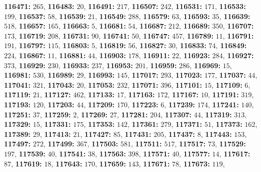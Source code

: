 \textsf{\bfseries 116471:} $265$, \textsf{\bfseries 116483:} $20$, \textsf{\bfseries 116491:} $217$, \textsf{\bfseries 116507:} $242$, \textsf{\bfseries 116531:} $171$, \textsf{\bfseries 116533:} $199$, \textsf{\bfseries 116537:} $58$, \textsf{\bfseries 116539:} $21$, \textsf{\bfseries 116549:} $288$, \textsf{\bfseries 116579:} $63$, \textsf{\bfseries 116593:} $35$, \textsf{\bfseries 116639:} $518$, \textsf{\bfseries 116657:} $165$, \textsf{\bfseries 116663:} $5$, \textsf{\bfseries 116681:} $54$, \textsf{\bfseries 116687:} $212$, \textsf{\bfseries 116689:} $350$, \textsf{\bfseries 116707:} $173$, \textsf{\bfseries 116719:} $208$, \textsf{\bfseries 116731:} $90$, \textsf{\bfseries 116741:} $50$, \textsf{\bfseries 116747:} $457$, \textsf{\bfseries 116789:} $11$, \textsf{\bfseries 116791:} $191$, \textsf{\bfseries 116797:} $115$, \textsf{\bfseries 116803:} $5$, \textsf{\bfseries 116819:} $56$, \textsf{\bfseries 116827:} $30$, \textsf{\bfseries 116833:} $74$, \textsf{\bfseries 116849:} $224$, \textsf{\bfseries 116867:} $11$, \textsf{\bfseries 116881:} $44$, \textsf{\bfseries 116903:} $178$, \textsf{\bfseries 116911:} $22$, \textsf{\bfseries 116923:} $284$, \textsf{\bfseries 116927:} $373$, \textsf{\bfseries 116929:} $230$, \textsf{\bfseries 116933:} $237$, \textsf{\bfseries 116953:} $201$, \textsf{\bfseries 116959:} $286$, \textsf{\bfseries 116969:} $15$, \textsf{\bfseries 116981:} $530$, \textsf{\bfseries 116989:} $29$, \textsf{\bfseries 116993:} $145$, \textsf{\bfseries 117017:} $293$, \textsf{\bfseries 117023:} $177$, \textsf{\bfseries 117037:} $44$, \textsf{\bfseries 117041:} $321$, \textsf{\bfseries 117043:} $20$, \textsf{\bfseries 117053:} $232$, \textsf{\bfseries 117071:} $396$, \textsf{\bfseries 117101:} $15$, \textsf{\bfseries 117109:} $6$, \textsf{\bfseries 117119:} $21$, \textsf{\bfseries 117127:} $462$, \textsf{\bfseries 117133:} $17$, \textsf{\bfseries 117163:} $172$, \textsf{\bfseries 117167:} $10$, \textsf{\bfseries 117191:} $319$, \textsf{\bfseries 117193:} $120$, \textsf{\bfseries 117203:} $44$, \textsf{\bfseries 117209:} $170$, \textsf{\bfseries 117223:} $6$, \textsf{\bfseries 117239:} $174$, \textsf{\bfseries 117241:} $140$, \textsf{\bfseries 117251:} $37$, \textsf{\bfseries 117259:} $2$, \textsf{\bfseries 117269:} $27$, \textsf{\bfseries 117281:} $204$, \textsf{\bfseries 117307:} $44$, \textsf{\bfseries 117319:} $313$, \textsf{\bfseries 117329:} $15$, \textsf{\bfseries 117331:} $175$, \textsf{\bfseries 117353:} $142$, \textsf{\bfseries 117361:} $279$, \textsf{\bfseries 117371:} $51$, \textsf{\bfseries 117373:} $162$, \textsf{\bfseries 117389:} $29$, \textsf{\bfseries 117413:} $21$, \textsf{\bfseries 117427:} $85$, \textsf{\bfseries 117431:} $205$, \textsf{\bfseries 117437:} $8$, \textsf{\bfseries 117443:} $153$, \textsf{\bfseries 117497:} $272$, \textsf{\bfseries 117499:} $367$, \textsf{\bfseries 117503:} $581$, \textsf{\bfseries 117511:} $517$, \textsf{\bfseries 117517:} $73$, \textsf{\bfseries 117529:} $197$, \textsf{\bfseries 117539:} $40$, \textsf{\bfseries 117541:} $38$, \textsf{\bfseries 117563:} $398$, \textsf{\bfseries 117571:} $40$, \textsf{\bfseries 117577:} $14$, \textsf{\bfseries 117617:} $87$, \textsf{\bfseries 117619:} $18$, \textsf{\bfseries 117643:} $170$, \textsf{\bfseries 117659:} $143$, \textsf{\bfseries 117671:} $78$, \textsf{\bfseries 117673:} $119$, 

